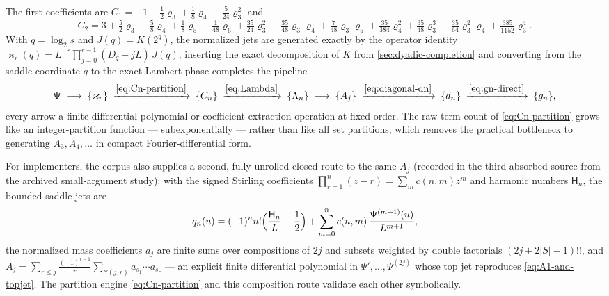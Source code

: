 \documentclass[11pt,oneside]{article}
\numberwithin{equation}{section}
\theoremstyle{definition}
\theoremstyle{remark}
\newcommand{\abs}[1]{\left\lvert #1\right\rvert}
\newcommand{\Hnum}{\mathsf H}
\begin{document}
The first coefficients are
$C_1=-1-\tfrac12\varrho_3+\tfrac18\varrho_4
-\tfrac5{24}\varrho_3^{2}$ and
\begin{equation}
 C_2=3+\tfrac52\varrho_3-\tfrac58\varrho_4+\tfrac18\varrho_5
 -\tfrac1{48}\varrho_6
 +\tfrac{35}{24}\varrho_3^{2}-\tfrac{35}{48}\varrho_3\varrho_4
 +\tfrac7{48}\varrho_3\varrho_5+\tfrac{35}{384}\varrho_4^{2}
 +\tfrac{35}{48}\varrho_3^{3}
 -\tfrac{35}{64}\varrho_3^{2}\varrho_4
 +\tfrac{385}{1152}\varrho_3^{4}.
 \label{eq:C2}
\end{equation}
With $q=\log_2s$ and $J(q)=K(2^{q})$, the normalized jets are
generated exactly by the operator identity
$\varkappa_r(q)=L^{-r}\prod_{j=0}^{r-1}(D_q-jL)\,J(q)$; inserting
the exact decomposition of $K$ from
\cref{sec:dyadic-completion} and converting from the saddle
coordinate $q$ to the exact Lambert phase completes the pipeline
\begin{equation}
 \Psi
 \;\longrightarrow\;\{\varkappa_r\}
 \;\xrightarrow{\eqref{eq:Cn-partition}}\;\{C_n\}
 \;\xrightarrow{\eqref{eq:Lambda}}\;\{\Lambda_n\}
 \;\longrightarrow\;\{A_j\}
 \;\xrightarrow{\eqref{eq:diagonal-dn}}\;\{d_n\}
 \;\xrightarrow{\eqref{eq:gn-direct}}\;\{g_n\},
 \label{eq:pipeline}
\end{equation}
every arrow a finite differential-polynomial or
coefficient-extraction operation at fixed order.  The raw term count
of \eqref{eq:Cn-partition} grows like an integer-partition function
--- subexponentially --- rather than like all set partitions, which
removes the practical bottleneck to generating $A_3,A_4,\dots$ in
compact Fourier-differential form.

For implementers, the corpus also supplies a second, fully unrolled
closed route to the same $A_j$ (recorded in the third absorbed
source from the archived small-argument study): with the signed
Stirling coefficients $\prod_{r=1}^{n}(z-r)=\sum_mc(n,m)z^{m}$ and
harmonic numbers $\Hnum_n$, the bounded saddle jets are
\begin{equation}
 q_n(u)=(-1)^{n}n!\Bigl(\frac{\Hnum_n}{L}-\frac12\Bigr)
 +\sum_{m=0}^{n}c(n,m)\,\frac{\Psi^{(m+1)}(u)}{L^{m+1}},
 \label{eq:qn-jets}
\end{equation}
the normalized mass coefficients $a_j$ are finite sums over
compositions of $2j$ and subsets weighted by double factorials
$(2j+2\abs S-1)!!$, and
$A_j=\sum_{r\le j}\frac{(-1)^{r-1}}r
\sum_{\mathcal C(j,r)}a_{s_1}\cdots a_{s_r}$ --- an explicit finite
differential polynomial in $\Psi',\dots,\Psi^{(2j)}$ whose top jet
reproduces \eqref{eq:A1-and-topjet}.  The partition engine
\eqref{eq:Cn-partition} and this composition route validate each
other symbolically.
\end{document}
